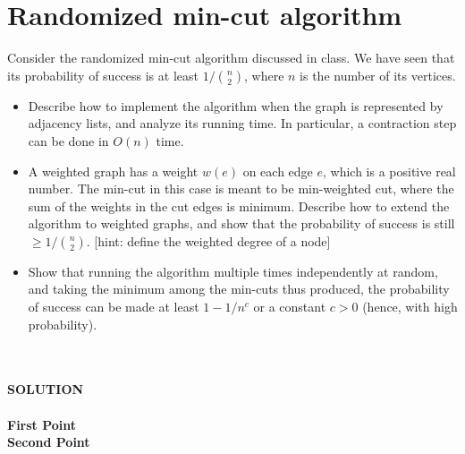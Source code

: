 \documentclass[a4paper]{article}
\begin{document}
\section*{Randomized min-cut algorithm}
Consider the randomized min-cut algorithm discussed in class.
We have seen that its probability of success is at least $1 / \binom{n}{2}$, where $n$ is the number of its vertices.
\begin{itemize}
\item Describe how to implement the algorithm when the graph is represented by adjacency lists, and analyze its running time.
In particular, a contraction step can be done in $O(n)$ time.
\item A weighted graph has a weight $w(e)$ on each edge $e$, which  is  a  positive  real number.
The  min-cut  in  this  case  is  meant  to  be  min-weighted  cut,  where  the sum  of  the  weights  in  the  cut  edges  is  minimum.
Describe  how  to  extend  the algorithm  to  weighted  graphs,  and  show  that  the  probability  of  success  is  still $\geq 1/\binom{n}{2}$. [hint: define the weighted degree of a node]
\item Show that running the algorithm multiple times independently at random, and taking the minimum among the min-cuts thus produced, the probability of success can be made at least $1 - 1/n^c$ or a constant $c > 0$ (hence, with high probability).
\end{itemize}
\
\\
\\
\textbf{SOLUTION}
\\
\\

\noindent
\textbf{First Point}
\\

\noindent
\textbf{Second Point}
\\
\end{document}
